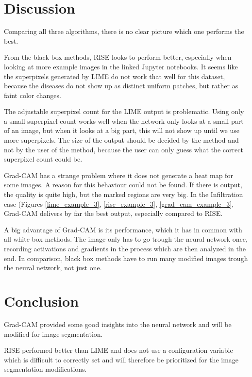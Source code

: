 \section{Discussion}
Comparing all three algorithms, there is no clear picture which one performs the best.

From the black box methods, RISE looks to perform better, especially when looking at more example images in the linked Jupyter notebooks. It seems like
the superpixels generated by LIME do not work that well for this dataset, because the diseases do not show up as distinct uniform patches, but rather as faint color changes.

The adjustable superpixel count for the LIME output is problematic. Using only a small superpixel count works well when the network only looks at a small part of an image, but when it looks
at a big part, this will not show up until we use more superpixels. The size of the output should be decided by the method and not by the user of the method, because the user can only guess what
the correct superpixel count could be.

Grad-CAM has a strange problem where it does not generate a heat map for some images. A reason for this behaviour could not be found. If there is output,
the quality is quite high, but the marked regions are very big. In the Infiltration case (Figures \ref{lime_example_3}, \ref{rise_example_3}, \ref{grad_cam_example_3}, Grad-CAM delivers by far
the best output, especially compared to RISE.

A big advantage of Grad-CAM is its performance, which it has in common with all white box methods. The image only has to go trough the neural network once, recording activations and gradients in the process which are then analyzed in the end. In comparison, black box methods have to run many modified images trough the neural network, not just one.

\section{Conclusion}
Grad-CAM provided some good insights into the neural network and will be modified for image segmentation.

RISE performed better than LIME and does not use a configuration variable which is difficult to correctly set and will therefore be prioritized for the image segmentation modifications.
